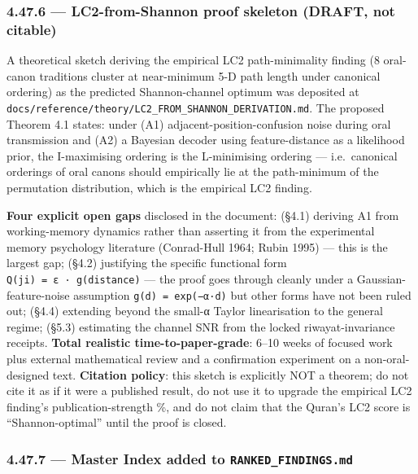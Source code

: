\documentclass[
]{article}
\begin{document}
\subsubsection{4.47.6 --- LC2-from-Shannon proof skeleton (DRAFT, not
citable)}\label{lc2-from-shannon-proof-skeleton-draft-not-citable}

A theoretical sketch deriving the empirical LC2 path-minimality finding
(8 oral-canon traditions cluster at near-minimum 5-D path length under
canonical ordering) as the predicted Shannon-channel optimum was
deposited at
\texttt{docs/reference/theory/LC2\_FROM\_SHANNON\_DERIVATION.md}. The
proposed Theorem 4.1 states: under (A1) adjacent-position-confusion
noise during oral transmission and (A2) a Bayesian decoder using
feature-distance as a likelihood prior, the I-maximising ordering is the
L-minimising ordering --- i.e.~canonical orderings of oral canons should
empirically lie at the path-minimum of the permutation distribution,
which is the empirical LC2 finding.

\textbf{Four explicit open gaps} disclosed in the document: (§4.1)
deriving A1 from working-memory dynamics rather than asserting it from
the experimental memory psychology literature (Conrad-Hull 1964; Rubin
1995) --- this is the largest gap; (§4.2) justifying the specific
functional form \texttt{Q(j\textbar{}i)\ =\ ε\ ·\ g(distance)} --- the
proof goes through cleanly under a Gaussian-feature-noise assumption
\texttt{g(d)\ =\ exp(−α·d)} but other forms have not been ruled out;
(§4.4) extending beyond the small-α Taylor linearisation to the general
regime; (§5.3) estimating the channel SNR from the locked
riwayat-invariance receipts. \textbf{Total realistic
time-to-paper-grade}: 6--10 weeks of focused work plus external
mathematical review and a confirmation experiment on a non-oral-designed
text. \textbf{Citation policy}: this sketch is explicitly NOT a theorem;
do not cite it as if it were a published result, do not use it to
upgrade the empirical LC2 finding's publication-strength \%, and do not
claim that the Quran's LC2 score is ``Shannon-optimal'' until the proof
is closed.

\subsubsection{\texorpdfstring{4.47.7 --- Master Index added to
\texttt{RANKED\_FINDINGS.md}}{4.47.7 --- Master Index added to RANKED\_FINDINGS.md}}\label{master-index-added-to-ranked_findings.md}
\end{document}

